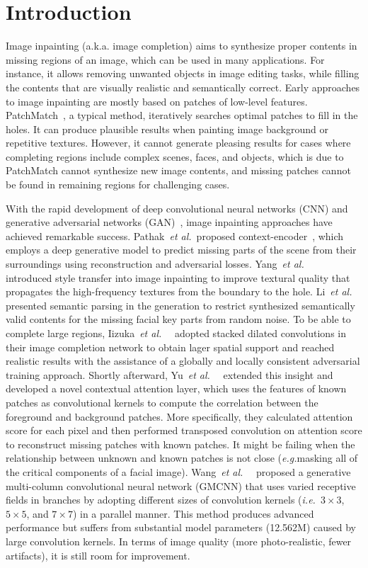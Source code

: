 \documentclass[journal]{IEEEtran}
\newcommand{\etal}{\emph{et al.}~}
\newcommand{\ie}{\emph{i.e.}}
\newcommand{\eg}{\emph{e.g.}}
\begin{document}
\IEEEpeerreviewmaketitle


\section{Introduction}
Image inpainting (a.k.a. image completion) aims to synthesize proper contents in missing regions of an image, which can be used in many applications. For instance, it allows removing unwanted objects in image editing tasks, while filling the contents that are visually realistic and semantically correct. Early approaches to image inpainting are mostly based on patches of low-level features. PatchMatch~\cite{patch-match}, a typical method, iteratively searches optimal patches to fill in the holes. It can produce plausible results when painting image background or repetitive textures. However, it cannot generate pleasing results for cases where completing regions include complex scenes, faces, and objects, which is due to PatchMatch cannot synthesize new image contents, and missing patches cannot be found in remaining regions for challenging cases.

With the rapid development of deep convolutional neural networks (CNN) and generative adversarial networks (GAN)~\cite{GAN}, image inpainting approaches have achieved remarkable success. Pathak~\etal proposed context-encoder~\cite{CE}, which employs a deep generative model to predict missing parts of the scene from their surroundings using reconstruction and adversarial losses. Yang~\etal~\cite{high-resolution-multi-scale} introduced style transfer into image inpainting to improve textural quality that propagates the high-frequency textures from the boundary to the hole. Li~\etal~\cite{GFC} presented semantic parsing in the generation to restrict synthesized semantically valid contents for the missing facial key parts from random noise. To be able to complete large regions, Iizuka~\etal~\cite{globally-and-locally} adopted stacked dilated convolutions in their image completion network to obtain lager spatial support and reached realistic results with the assistance of a globally and locally consistent adversarial training approach. Shortly afterward, Yu~\etal~\cite{contextual-attention} extended this insight and developed a novel contextual attention layer, which uses the features of known patches as convolutional kernels to compute the correlation between the foreground and background patches. More specifically, they calculated attention score for each pixel and then performed transposed convolution on attention score to reconstruct missing patches with known patches. It might be failing when the relationship between unknown and known patches is not close (\eg masking all of the critical components of a facial image). Wang~\etal~\cite{GMCNN} proposed a generative multi-column convolutional neural network (GMCNN) that uses varied receptive fields in branches by adopting different sizes of convolution kernels (\ie~$3\times 3$, $ 5\times 5$, and $7 \times 7$) in a parallel manner. This method produces advanced performance but suffers from substantial model parameters (12.562M) caused by large convolution kernels. In terms of image quality (more photo-realistic, fewer artifacts), it is still room for improvement.
\end{document}
